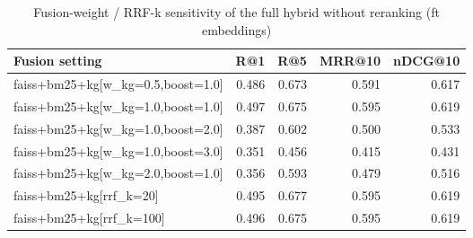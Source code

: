 \begin{table}
\caption{Fusion-weight / RRF-k sensitivity of the full hybrid without reranking (ft embeddings)}
\label{tab:sweep_ft}
\begin{tabular}{lrrrr}
\toprule
Fusion setting & R@1 & R@5 & MRR@10 & nDCG@10 \\
\midrule
faiss+bm25+kg[w\_kg=0.5,boost=1.0] & 0.486 & 0.673 & 0.591 & 0.617 \\
faiss+bm25+kg[w\_kg=1.0,boost=1.0] & 0.497 & 0.675 & 0.595 & 0.619 \\
faiss+bm25+kg[w\_kg=1.0,boost=2.0] & 0.387 & 0.602 & 0.500 & 0.533 \\
faiss+bm25+kg[w\_kg=1.0,boost=3.0] & 0.351 & 0.456 & 0.415 & 0.431 \\
faiss+bm25+kg[w\_kg=2.0,boost=1.0] & 0.356 & 0.593 & 0.479 & 0.516 \\
faiss+bm25+kg[rrf\_k=20] & 0.495 & 0.677 & 0.595 & 0.619 \\
faiss+bm25+kg[rrf\_k=100] & 0.496 & 0.675 & 0.595 & 0.619 \\
\bottomrule
\end{tabular}
\end{table}
